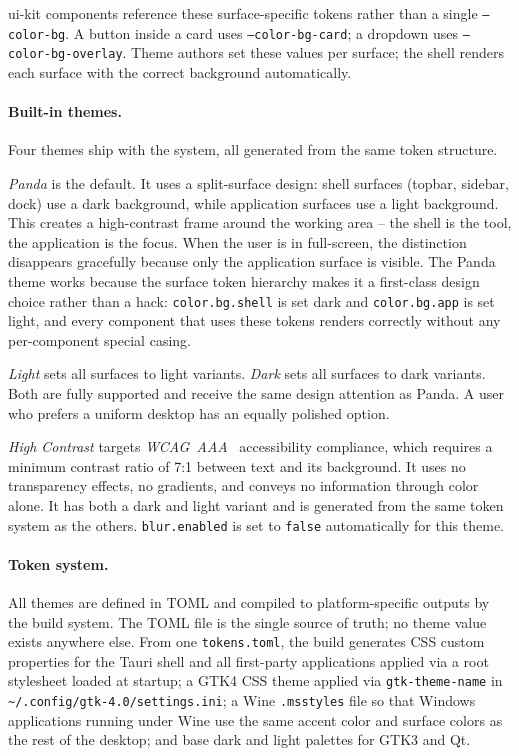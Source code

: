 ui-kit components reference these surface-specific tokens rather than a single
\texttt{--color-bg}. A button inside a card uses \texttt{--color-bg-card}; a
dropdown uses \texttt{--color-bg-overlay}. Theme authors set these values per
surface; the shell renders each surface with the correct background
automatically.

\paragraph{Built-in themes.}
Four themes ship with the system, all generated from the same token structure.

\emph{Panda} is the default. It uses a split-surface design: shell surfaces
(topbar, sidebar, dock) use a dark background, while application surfaces use
a light background. This creates a high-contrast frame around the working area
-- the shell is the tool, the application is the focus. When the user is in
full-screen, the distinction disappears gracefully because only the application
surface is visible. The Panda theme works because the surface token hierarchy
makes it a first-class design choice rather than a hack: \texttt{color.bg.shell}
is set dark and \texttt{color.bg.app} is set light, and every component that
uses these tokens renders correctly without any per-component special casing.

\emph{Light} sets all surfaces to light variants. \emph{Dark} sets all
surfaces to dark variants. Both are fully supported and receive the same design
attention as Panda. A user who prefers a uniform desktop has an equally polished
option.

\emph{High Contrast} targets \emph{WCAG~AAA}~\cite{wcag} accessibility
compliance, which requires a minimum contrast ratio of 7:1 between text and
its background. It uses no transparency effects, no gradients, and conveys no
information through color alone. It has both a dark and light variant and is
generated from the same token system as the others. \texttt{blur.enabled} is
set to \texttt{false} automatically for this theme.

\paragraph{Token system.}
All themes are defined in TOML and compiled to platform-specific outputs by
the build system. The TOML file is the single source of truth; no theme value
exists anywhere else. From one \texttt{tokens.toml}, the build generates CSS
custom properties for the Tauri shell and all first-party applications applied
via a root stylesheet loaded at startup; a GTK4 CSS theme applied via
\texttt{gtk-theme-name} in \texttt{\textasciitilde/.config/gtk-4.0/settings.ini};
a Wine \texttt{.msstyles} file so that Windows applications running under
Wine use the same accent color and surface colors as the rest of the desktop;
and base dark and light palettes for GTK3 and Qt.

